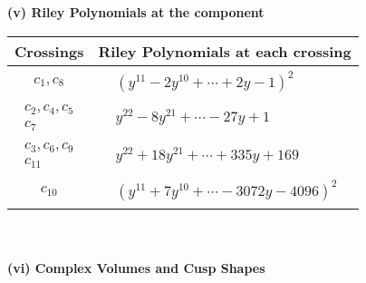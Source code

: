 \documentclass[1p]{elsarticle_modified}
\theoremstyle{definition}
\begin{document}
\newpage\renewcommand{\arraystretch}{1}
\flushleft \textbf{(v) Riley Polynomials at the component}\newline \\
\begin{tabular}{m{50pt}|m{274pt}}
Crossings & \hspace{64pt}Riley Polynomials at each crossing \\
\hline $$\begin{aligned}c_{1},c_{8}\end{aligned}$$&$\begin{aligned}
&(y^{11}-2 y^{10}+\cdots+2 y-1)^{2}
\end{aligned}$\\
\hline $$\begin{aligned}c_{2},c_{4},c_{5}\\c_{7}\end{aligned}$$&$\begin{aligned}
&y^{22}-8 y^{21}+\cdots-27 y+1
\end{aligned}$\\
\hline $$\begin{aligned}c_{3},c_{6},c_{9}\\c_{11}\end{aligned}$$&$\begin{aligned}
&y^{22}+18 y^{21}+\cdots+335 y+169
\end{aligned}$\\
\hline $$\begin{aligned}c_{10}\end{aligned}$$&$\begin{aligned}
&(y^{11}+7 y^{10}+\cdots-3072 y-4096)^{2}
\end{aligned}$\\
\hline
\end{tabular}\\~\\
\newpage\flushleft \textbf{(vi) Complex Volumes and Cusp Shapes}
\end{document}
